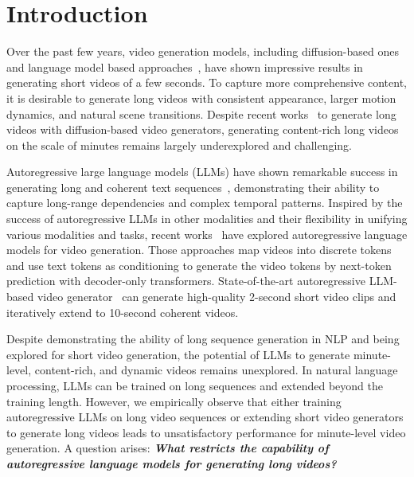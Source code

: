 \section{Introduction}


\vspace{-10pt}

Over the past few years, video generation models, including diffusion-based ones~\cite{video-diffusion-models,gen1_paper,make-a-video,bar2024lumiere,MakePixelsDance,girdhar2023emu,zhou2022magicvideo,wang2024magicvideo} and language model based approaches~\cite{yan2021videogpt,kondratyuk2023videopoet}, have shown impressive results in generating short videos of a few seconds.
To capture more comprehensive content, it is desirable to generate long videos with consistent appearance, larger motion dynamics, and natural scene transitions.
Despite recent works~\cite{wang2023gen_L,streamingt2v,openai2024sora} to generate long videos with diffusion-based video generators, generating content-rich long videos on the scale of minutes remains largely underexplored and challenging.


Autoregressive large language models (LLMs) have shown remarkable success in generating long and coherent text sequences~\cite{radford2018improving, radford2019language, gpt3, reid2024gemini, touvron2023llama, touvron2023llama2}, demonstrating their ability to capture long-range dependencies and complex temporal patterns. 
Inspired by the success of autoregressive LLMs in other modalities and their flexibility in unifying various modalities and tasks, recent works~\cite{yan2021videogpt,kondratyuk2023videopoet} have explored autoregressive language models for video generation.
Those approaches map videos into discrete tokens and use text tokens as conditioning to generate the video tokens by next-token prediction with decoder-only transformers.
State-of-the-art autoregressive LLM-based video generator~\cite{kondratyuk2023videopoet} can generate high-quality 2-second short video clips and iteratively extend to 10-second coherent videos.

Despite demonstrating the ability of long sequence generation in NLP and being explored for short video generation, the potential of LLMs to generate minute-level, content-rich, and dynamic videos remains unexplored. In natural language processing, LLMs can be trained on long sequences and extended beyond the training length. However, we empirically observe that either training autoregressive LLMs on long video sequences or extending short video generators to generate long videos leads to unsatisfactory performance for minute-level video generation. A question arises: \textbf{\textit{What restricts the capability of autoregressive language models for generating long videos?}}



